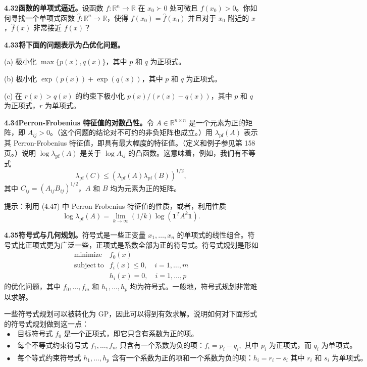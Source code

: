 \documentclass[UTF8, 12pt, fontset=fandol, oneside]{ctexart}
\begin{document}
\noindent\textbf{4.32\quad 函数的单项式逼近。}\quad 设函数 $f:\mathbb{R}^n\to\mathbb{R}$ 在 $x_0\succ0$ 处可微且 $f(x_0)>0$。你如何寻找一个单项式函数 $\hat f:\mathbb{R}^n\to\mathbb{R}$，使得 $f(x_0)=\hat f(x_0)$ 并且对于 $x_0$ 附近的 $x$，$\hat f(x)$ 非常接近 $f(x)$？

\noindent\textbf{4.33\quad 将下面的问题表示为凸优化问题。}

(a) 极小化 $\max\{p(x),q(x)\}$，其中 $p$ 和 $q$ 为正项式。

(b) 极小化 $\exp(p(x))+\exp(q(x))$，其中 $p$ 和 $q$ 为正项式。

(c) 在 $r(x)>q(x)$ 的约束下极小化 $p(x)/(r(x)-q(x))$，其中 $p$ 和 $q$ 为正项式，$r$ 为单项式。

\noindent\textbf{4.34\quad Perron-Frobenius 特征值的对数凸性。}\quad 令 $A\in\mathbb{R}^{n\times n}$ 是一个元素为正的矩阵，即 $A_{ij}>0$。（这个问题的结论对不可约的非负矩阵也成立。）用 $\lambda_{\mathrm{pf}}(A)$ 表示其 Perron-Frobenius 特征值，即具有最大幅度的特征值。（定义和例子参见第 158 页。）说明 $\log\lambda_{\mathrm{pf}}(A)$ 是关于 $\log A_{ij}$ 的凸函数。这意味着，例如，我们有不等式
\[
\lambda_{\mathrm{pf}}(C)\leq(\lambda_{\mathrm{pf}}(A)\lambda_{\mathrm{pf}}(B))^{1/2},
\]
其中 $C_{ij}=(A_{ij}B_{ij})^{1/2}$，$A$ 和 $B$ 均为元素为正的矩阵。

提示：利用 (4.47) 中 Perron-Frobenius 特征值的性质，或者，利用性质
\[
\log\lambda_{\mathrm{pf}}(A)=\lim_{k\to\infty}(1/k)\log(\mathbf{1}^TA^k\mathbf{1}).
\]

\noindent\textbf{4.35\quad 符号式与几何规划。}\quad 符号式是一些正变量 $x_1,\ldots,x_n$ 的单项式的线性组合。符号式比正项式更为广泛一些，正项式是系数全部为正的符号式。符号式规划是形如
\[
\begin{array}{ll}
\mathop{\mathrm{minimize}} & f_0(x)\\
\mathrm{subject\ to} & f_i(x)\leq0,\quad i=1,\ldots,m\\
& h_i(x)=0,\quad i=1,\ldots,p
\end{array}
\]
的优化问题，其中 $f_0,\ldots,f_m$ 和 $h_1,\ldots,h_p$ 均为符号式。一般地，符号式规划非常难以求解。

一些符号式规划可以被转化为 GP，因此可以得到有效求解。说明如何对下面形式的符号式规划做到这一点：
\[
\begin{array}{l}
\bullet\quad \text{目标符号式 }f_0\text{ 是一个正项式，即它只含有系数为正的项。}\\
\bullet\quad \text{每个不等式约束符号式 }f_1,\ldots,f_m\text{ 只含有一个系数为负的项：}f_i=p_i-q_i,\text{ 其中 }p_i\text{ 为正项式，而 }q_i\text{ 为单项式。}\\
\bullet\quad \text{每个等式约束符号式 }h_1,\ldots,h_p\text{ 含有一个系数为正的项和一个系数为负的项：}h_i=r_i-s_i\text{ 其中 }r_i\text{ 和 }s_i\text{ 为单项式。}
\end{array}
\]
\end{document}

